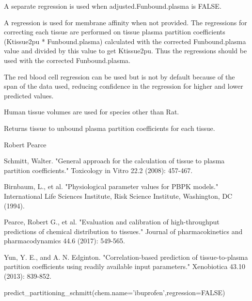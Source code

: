 \documentclass[a4paper]{book}
\begin{document}
%
\begin{Details}\relax
A separate regression is used when adjusted.Funbound.plasma is FALSE.

A regression is used for membrane affinity when not provided.  The
regressions for correcting each tissue are performed on tissue plasma
partition coefficients (Ktissue2pu * Funbound.plasma) calculated with the
corrected Funbound.plasma value and divided by this value to get Ktissue2pu.
Thus the regressions should be used with the corrected Funbound.plasma.

The red blood cell regression can be used but is not by default because of
the span of the data used, reducing confidence in the regression for higher
and lower predicted values.

Human tissue volumes are used for species other than Rat.
\end{Details}
%
\begin{Value}
Returns tissue to unbound plasma partition coefficients for each
tissue.
\end{Value}
%
\begin{Author}\relax
Robert Pearce
\end{Author}
%
\begin{References}\relax
Schmitt, Walter. "General approach for the calculation of tissue to plasma 
partition coefficients." Toxicology in Vitro 22.2 (2008): 457-467.

Birnbaum, L., et al. "Physiological parameter values for PBPK models." 
International Life Sciences Institute, Risk Science Institute, Washington, 
DC (1994).

Pearce, Robert G., et al. "Evaluation and calibration of high-throughput 
predictions of chemical distribution to tissues." Journal of pharmacokinetics 
and pharmacodynamics 44.6 (2017): 549-565.

Yun, Y. E., and A. N. Edginton. "Correlation-based prediction of 
tissue-to-plasma partition coefficients using readily available input 
parameters." Xenobiotica 43.10 (2013): 839-852.
\end{References}
%
\begin{Examples}
\begin{ExampleCode}

predict_partitioning_schmitt(chem.name='ibuprofen',regression=FALSE)

\end{ExampleCode}
\end{Examples}
\end{document}
